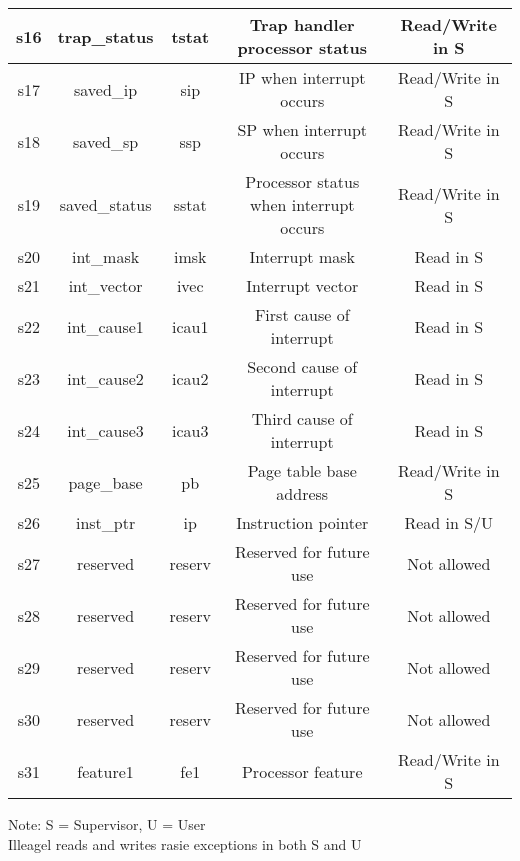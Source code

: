 \documentclass{article}
\begin{document}
\begin{table}[H]
\begin{tabular}{|c|c|c|c|c|}
    \hline s16  &   trap\_status    &   tstat       &   Trap handler processor status   &   Read/Write in S \\      
    \hline s17  &   saved\_ip       &   sip         &   IP when interrupt occurs    &   Read/Write in S \\
    \hline s18  &   saved\_sp       &   ssp         &   SP when interrupt occurs    &   Read/Write in S \\
    \hline s19  &   saved\_status   &   sstat       &   Processor status when interrupt occurs  &   Read/Write in S \\
    \hline s20  &   int\_mask       &   imsk            &   Interrupt mask              &   Read in S \\
    \hline s21  &   int\_vector     &   ivec            &   Interrupt vector            &   Read in S \\
    \hline s22  &   int\_cause1     &   icau1       &   First cause of interrupt    &   Read in S \\
    \hline s23  &   int\_cause2     &   icau2       &   Second cause of interrupt   &   Read in S \\
    \hline s24  &   int\_cause3     &   icau3       &   Third cause of interrupt    &   Read in S \\    
    \hline s25  &   page\_base      &   pb          &   Page table base address &   Read/Write in S \\  
    \hline s26  &   inst\_ptr       &   ip          &   Instruction pointer &   Read in S/U \\  
    \hline s27  &   reserved        &   reserv      &   Reserved for future use &   Not allowed \\  
    \hline s28  &   reserved        &   reserv      &   Reserved for future use &   Not allowed \\  
    \hline s29  &   reserved        &   reserv      &   Reserved for future use &   Not allowed \\  
    \hline s30  &   reserved        &   reserv      &   Reserved for future use &   Not allowed \\  
    \hline s31  &   feature1        &   fe1         &   Processor feature   &   Read/Write in S \\  
    \hline
    \end{tabular}
    \end{table}
    
    Note:  S = Supervisor, U = User \\
    Illeagel reads and writes rasie exceptions in both S and U
\end{document}
